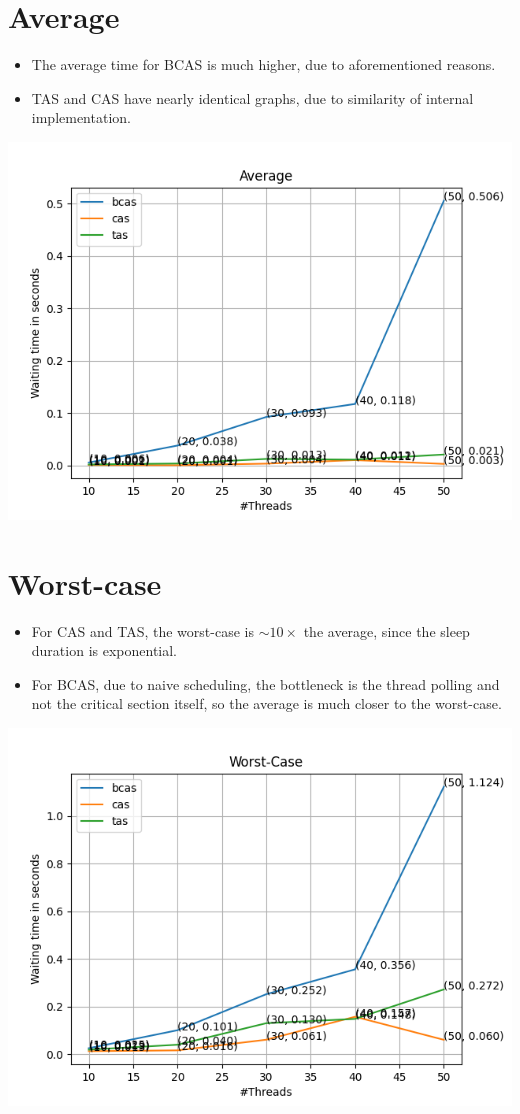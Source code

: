 \documentclass{amsart}
\begin{document}
\newpage

\section{Average}

\begin{itemize}
    \item The average time for BCAS is much higher, due to aforementioned reasons. 
    \item TAS and CAS have nearly identical graphs, due to similarity of internal implementation.
\end{itemize}

\centering
\includegraphics[scale = 0.75]{avg.png}

\newpage

\section{Worst-case}

\begin{itemize}
    \item For CAS and TAS, the worst-case is \(\sim 10 \times\) the average, since the sleep duration is exponential.
    \item For BCAS, due to naive scheduling, the bottleneck is the thread polling and not the critical section itself, so the average is much closer to the worst-case.
\end{itemize}

\centering
\includegraphics[scale = 0.75]{wc.png}
\end{document}

